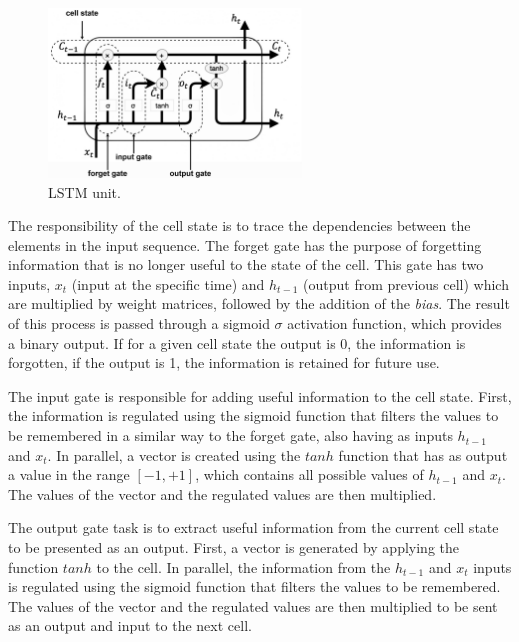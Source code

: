 \begin{figure}[h!]
    \centering
    \begin{center}
    \includegraphics[width=0.6\textwidth]{Images/LSTM_cell_detailed.jpeg}
    \caption{LSTM unit.}
    \label{lstm}
    \end{center}
\end{figure}

The responsibility of the cell state is to trace the dependencies between the elements in the input sequence. The forget gate has the purpose of forgetting information that is no longer useful to the state of the cell. This gate has two inputs, $x_t$ (input at the specific time) and $h_{t-1}$ (output from previous cell) which are multiplied by weight matrices, followed by the addition of the \textit{bias}. The result of this process is passed through a sigmoid $\sigma$ activation function, which provides a binary output. If for a given cell state the output is 0, the information is forgotten, if the output is 1, the information is retained for future use.

The input gate is responsible for adding useful information to the cell state. First, the information is regulated using the sigmoid function that filters the values to be remembered in a similar way to the forget gate, also having as inputs $h_{t-1}$ and $x_t$. In parallel, a vector is created using the $tanh$ function that has as output a value in the range $ [-1, +1]$, which contains all possible values of $h_{t-1}$ and $x_t$. The values of the vector and the regulated values are then multiplied. 

The output gate task is to extract useful information from the current cell state to be presented as an output. First, a vector is generated by applying the function $tanh$ to the cell. In parallel, the information from the $h_{t-1}$ and $x_t$ inputs is regulated using the sigmoid function that filters the values to be remembered. The values of the vector and the regulated values are then multiplied to be sent as an output and input to the next cell.


